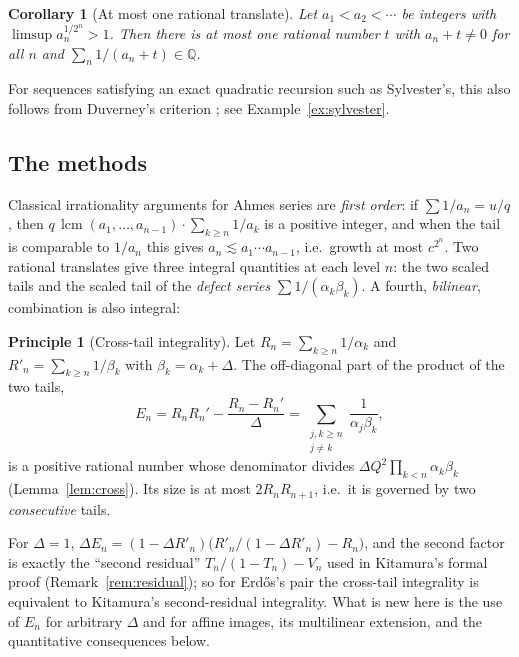 \documentclass[11pt]{amsart}
\newtheorem{maincor}[theorem]{Corollary}
\theoremstyle{definition}
\newtheorem{principle}[lemma]{Principle}
\theoremstyle{remark}
\newcommand{\Q}{\mathbb{Q}}
\DeclareMathOperator{\lcm}{lcm}
\begin{document}
\begin{maincor}[At most one rational translate]\label{cor:E}
Let $a_1<a_2<\cdots$ be integers with $\limsup a_n^{1/2^n}>1$. Then there is at most
one rational number $t$ with $a_n+t\ne0$ for all $n$ and $\sum_n 1/(a_n+t)\in\Q$.
\end{maincor}

For sequences satisfying an exact quadratic recursion such as Sylvester's, this also
follows from Duverney's criterion \cite{Duverney01}; see Example~\ref{ex:sylvester}.

\subsection{The methods}
Classical irrationality arguments for Ahmes series are \emph{first order}: if
$\sum 1/a_n=u/q$, then $q\,\lcm(a_1,\dots,a_{n-1})\cdot\sum_{k\ge n}1/a_k$ is a positive
integer, and when the tail is comparable to $1/a_n$ this gives
$a_n\lesssim a_1\cdots a_{n-1}$, i.e.\ growth at most $c^{2^n}$. Two rational
translates give three integral quantities at each level $n$: the two scaled tails and
the scaled tail of the \emph{defect series} $\sum 1/(\alpha_k\beta_k)$. A fourth,
\emph{bilinear}, combination is also integral:

\begin{principle}[Cross-tail integrality]\label{princ}
Let $R_n=\sum_{k\ge n}1/\alpha_k$ and $R'_n=\sum_{k\ge n}1/\beta_k$ with
$\beta_k=\alpha_k+\Delta$. The off-diagonal part of the product of the two tails,
\[
E_n=R_nR_n'-\frac{R_n-R_n'}{\Delta}=\sum_{\substack{j,k\ge n\\ j\ne k}}\frac{1}{\alpha_j\beta_k},
\]
is a positive rational number whose denominator divides
$\Delta Q^2\prod_{k<n}\alpha_k\beta_k$ (Lemma~\ref{lem:cross}). Its size is at most
$2R_nR_{n+1}$, i.e.\ it is governed by two \emph{consecutive} tails.
\end{principle}

For $\Delta=1$, $\Delta E_n=(1-\Delta R'_n)\bigl(R'_n/(1-\Delta R'_n)-R_n\bigr)$, and the
second factor is exactly the ``second residual'' $T_n/(1-T_n)-V_n$ used in Kitamura's
formal proof \cite{Kit26} (Remark~\ref{rem:residual}); so for Erd\H{o}s's pair the
cross-tail integrality is equivalent to Kitamura's second-residual integrality. What is
new here is the use of $E_n$ for arbitrary $\Delta$ and for affine images, its
multilinear extension, and the quantitative consequences below.
\end{document}
